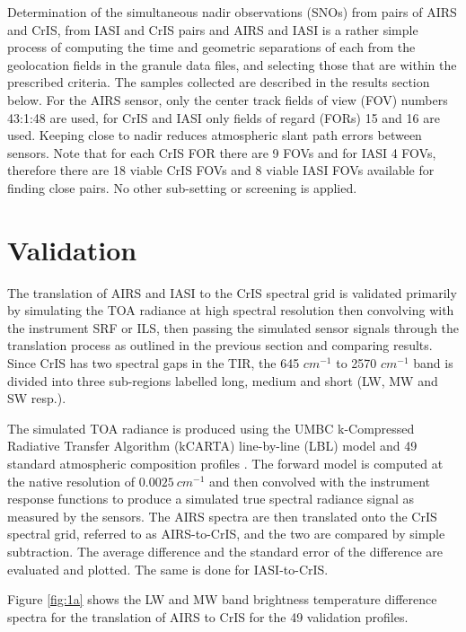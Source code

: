 \documentclass[twocolumn,10pt]{article}
\begin{document}
Determination of the simultaneous nadir observations (SNOs) from pairs of AIRS and CrIS, from IASI and CrIS pairs and AIRS and IASI is a rather simple process of computing the time and geometric separations of each from the geolocation fields in the granule data files, and selecting those that are within the prescribed criteria. The samples collected are described in the results section below. For the AIRS sensor, only the center track fields of view (FOV) numbers 43:1:48 are used, for CrIS and IASI only fields of regard (FORs) 15 and 16 are used. Keeping close to nadir reduces atmospheric slant path errors between sensors. Note that for each CrIS FOR there are 9 FOVs and for IASI 4 FOVs, therefore there are 18 viable CrIS FOVs and 8 viable IASI FOVs available for finding close pairs. No other sub-setting or screening is applied.

\section{Validation}
\label{sec:orgheadline7}

The translation of AIRS and IASI to the CrIS spectral grid is validated primarily by simulating the TOA radiance at high spectral resolution then convolving with the instrument SRF or ILS, then passing the simulated sensor signals through the translation process as outlined in the previous section and comparing results. Since CrIS has two spectral gaps in the TIR, the  645 $cm^{-1}$ to 2570 $cm^{-1}$ band is divided into three sub-regions labelled long, medium and short (LW, MW and SW resp.).

The simulated TOA radiance is produced using the UMBC k-Compressed Radiative Transfer Algorithm (kCARTA) line-by-line (LBL) model \cite{kcarta1998} and 49 standard atmospheric composition profiles \cite{TIGR1998}. The forward model is computed at the native resolution of $0.0025\ cm^{-1}$ and then convolved with the instrument response functions to produce a simulated true spectral radiance signal as measured by the sensors. The AIRS spectra are then translated onto the CrIS spectral grid, referred to as AIRS-to-CrIS, and the two are compared by simple subtraction. The average difference and the standard error of the difference are evaluated and plotted. The same is done for IASI-to-CrIS. 

Figure \ref{fig:1a} shows the LW and MW band brightness temperature difference spectra for the translation of AIRS to CrIS for the 49 validation profiles.
\end{document}
